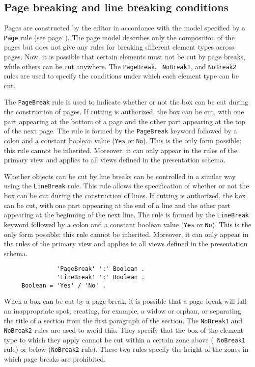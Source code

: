 \subsection{Page breaking and line breaking conditions}
\label{condcoupure}

Pages are constructed by the editor in accordance with the model
specified by a {\tt Page} rule (see page~\pageref{page}).  The page
model describes only the composition of the pages but does not give
any rules for breaking different element types across pages.  Now, it
is possible that certain elements must not be cut by page breaks,
while others can be cut anywhere.  The {\tt PageBreak}, {\tt
NoBreak1}, and {\tt NoBreak2} rules are used to specify the conditions
under which each element type can be cut.

The {\tt PageBreak} rule is used to indicate whether or not the box
can be cut during the construction of pages.  If cutting is
authorized, the box can be cut, with one part appearing at the bottom
of a page and the other part appearing at the top of the next page.
The rule is formed by the {\tt PageBreak} keyword followed by a colon
and a constant boolean value ({\tt Yes} or {\tt No}).  This is the only
form possible: this rule cannot be inherited.  Moreover, it can only
appear in the rules of the primary view and applies to all views
defined in the presentation schema.

Whether objects can be cut by line breaks can be controlled in a
similar way using the {\tt LineBreak} rule.  This rule allows the
specification of whether or not the box can be cut during the
construction of lines.  If cutting is authorized, the box can be cut,
with one part appearing at the end of a line and the other part
appearing at the beginning of the next line.  The rule is formed by
the {\tt LineBreak} keyword followed by a colon and a constant boolean
value ({\tt Yes} or {\tt No}).  This is the only form possible: this
rule cannot be inherited.  Moreover, it can only appear in the rules
of the primary view and applies to all views defined in the
presentation schema.

\begin{verbatim}
               'PageBreak' ':' Boolean .
               'LineBreak' ':' Boolean .
     Boolean = 'Yes' / 'No' .
\end{verbatim}

When a box can be cut by a page break, it is possible that a page
break will fall an inappropriate spot, creating, for example, a widow
or orphan, or separating the title of a section from the first
paragraph of the section.  The {\tt NoBreak1} and {\tt NoBreak2} rules
are used to avoid this.  They specify that the box of the element type
to which they apply cannot be cut within a certain zone above ({\tt
NoBreak1} rule) or below ({\tt NoBreak2} rule).  These two rules
specify the height of the zones in which page breaks are prohibited.

